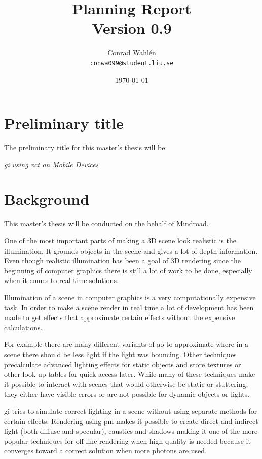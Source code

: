 \documentclass[a4paper, 12pt]{article}
\title{Planning Report \\ \small{Version 0.9}}
\author{Conrad Wahlén \\ \texttt{conwa099@student.liu.se}}
\date{\today}
\begin{document}
\maketitle
\thispagestyle{empty}
\newpage


\section{Preliminary title}
\label{sec:Preliminary title}

The preliminary title for this master's thesis will be:

\textit{\acrlong{gi} using \acrlong{vct} on Mobile Devices}

\section{Background}
\label{sec:Background}

This master's thesis will be conducted on the behalf of Mindroad.

One of the most important parts of making a 3D scene look realistic is the illumination. It grounds objects in the scene and gives a lot of depth information. Even though realistic illumination has been a goal of 3D rendering since the beginning of computer graphics there is still a lot of work to be done, especially when it comes to real time solutions.

Illumination of a scene in computer graphics is a very computationally expensive task. In order to make a scene render in real time a lot of development has been made to get effects that approximate certain effects without the expensive calculations.

For example there are many different variants of \gls{ao} to approximate where in a scene there should be less light if the light was bouncing. Other techniques precalculate advanced lighting effects for static objects and store textures or other look-up-tables for quick access later. While many of these techniques make it possible to interact with scenes that would otherwise be static or stuttering, they either have visible errors or are not possible for dynamic objects or lights.

\gls{gi} tries to simulate correct lighting in a scene without using separate methods for certain effects. Rendering using \gls{pm} makes it possible to create direct and indirect light (both diffuse and specular), caustics and shadows making it one of the more popular techniques for off-line rendering when high quality is needed because it converges toward a correct solution when more photons are used.
\end{document}
